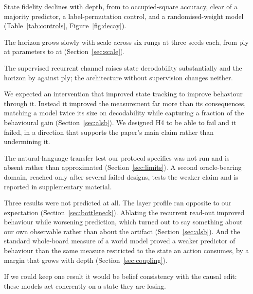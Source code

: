 \documentclass[11pt]{article}
\theoremstyle{remark}
\begin{document}
\begin{description}[nosep]
\item[H1, supported.] State fidelity declines with depth, from
 to  occupied-square accuracy, clear of a
majority predictor, a label-permutation control, and a randomised-weight model
(Table~\ref{tab:controls}, Figure~\ref{fig:decay}).
\item[H2, supported.] The horizon grows slowly with scale across six rungs at
three seeds each, from  ply at  parameters
to  at  (Section~\ref{sec:scale}).
\item[H3, supported only weakly.] The supervised recurrent channel raises state
decodability substantially and the horizon by  against
 ply; the architecture without supervision changes neither.
\item[H4, not supported as predicted.] We expected an intervention that improved
state tracking to improve behaviour through it. Instead it improved the
measurement far more than its consequences, matching a model twice its size on
decodability while capturing a fraction of the behavioural gain
(Section~\ref{sec:alsb}). We designed H4 to be able to fail and it failed, in a
direction that supports the paper's main claim rather than undermining it.
\item[H5, partially addressed.] The natural-language transfer test our protocol
specifies was not run and is absent rather than approximated
(Section~\ref{sec:limits}). A second oracle-bearing domain, reached only after
several failed designs, tests the weaker claim and is reported in supplementary
material.
\end{description}

Three results were not predicted at all. The layer profile ran opposite to our
expectation (Section~\ref{sec:bottleneck}). Ablating the recurrent read-out
improved behaviour while worsening prediction, which turned out to say something
about our own observable rather than about the artifact
(Section~\ref{sec:alsb}). And the standard whole-board measure of a world model
proved a weaker predictor of behaviour than the same measure restricted to the
state an action consumes, by a margin that grows with depth
(Section~\ref{sec:coupling}).

If we could keep one result it would be belief consistency with the causal edit:
these models act coherently on a state they are losing.
\end{document}
